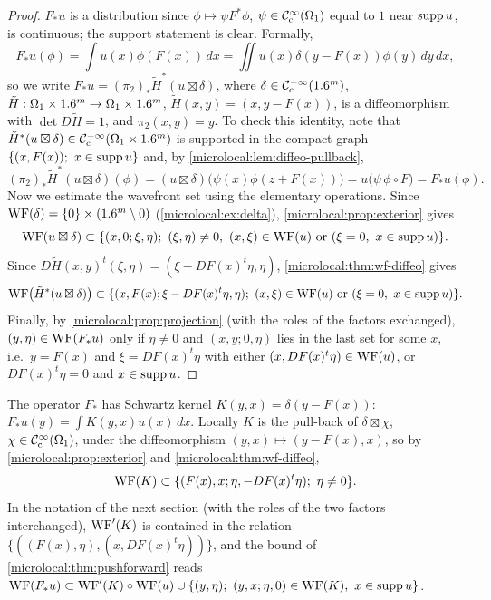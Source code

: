 \begin{proof}
  $F_*u$ is a distribution since $\phi\mapsto\psi F^*\phi$, $\psi\in\mathcal{C}^\infty_{\mathrm{c}}(\Omega_1)$
  equal to $1$ near $\operatorname{supp} u$, is continuous; the support statement is clear.
  Formally,
  \begin{equation*}
    F_*u(\phi)=\int u(x)\phi(F(x))\,dx=\iint u(x)\delta(y-F(x))\phi(y)\,dy\,dx,
  \end{equation*}
  so we write $F_*u=(\pi_2)_*\tilde H^*(u\boxtimes\delta)$, where
  $\delta\in\mathcal{C}^{-\infty}_{\mathrm{c}}(1.6^m)$, $\tilde H:\Omega_1\times1.6^m\to\Omega_1\times1.6^m$,
  $\tilde H(x,y)=(x,y-F(x))$, is a diffeomorphism with $\det D\tilde H=1$, and
  $\pi_2(x,y)=y$. To check this identity, note that
  $\tilde H^*(u\boxtimes\delta)\in\mathcal{C}^{-\infty}_{\mathrm{c}}(\Omega_1\times1.6^m)$ is supported in the
  compact graph $\{(x,F(x));\ x\in\operatorname{supp} u\}$ and, by
  \cref{microlocal:lem:diffeo-pullback},
  \begin{equation*}
    (\pi_2)_*\tilde H^*(u\boxtimes\delta)(\phi)
    =(u\boxtimes\delta)\bigl(\psi(x)\phi(z+F(x))\bigr)=u\bigl(\psi\,\phi\circ F\bigr)
    =F_*u(\phi).
  \end{equation*}
  Now we estimate the wavefront set using the elementary operations. Since
  $\operatorname{WF}(\delta)=\{0\}\times(1.6^m\setminus0)$ (\cref{microlocal:ex:delta}),
  \cref{microlocal:prop:exterior} gives
  \begin{equation*}
    \WF(u\boxtimes\delta)\subset\{(x,0;\xi,\eta);\ (\xi,\eta)\ne0,\
    (x,\xi)\in\WF(u)\text{ or }(\xi=0,\ x\in\supp u)\}.
  \end{equation*}
  Since $D\tilde H(x,y)^t(\xi,\eta)=(\xi-DF(x)^t\eta,\eta)$,
  \cref{microlocal:thm:wf-diffeo} gives
  \begin{equation*}
    \operatorname{WF}\bigl(\tilde H^*(u\boxtimes\delta)\bigr)\subset\{(x,F(x);\xi-DF(x)^t\eta,\eta);\
    (x,\xi)\in\operatorname{WF}(u)\text{ or }(\xi=0,\ x\in\operatorname{supp} u)\}.
  \end{equation*}
  Finally, by \cref{microlocal:prop:projection} (with the roles of the
  factors exchanged), $(y,\eta)\in\operatorname{WF}(F_*u)$ only if $\eta\ne0$ and
  $(x,y;0,\eta)$ lies in the last set for some $x$, i.e.\ $y=F(x)$ and
  $\xi=DF(x)^t\eta$ with either $(x,DF(x)^t\eta)\in\operatorname{WF}(u)$, or
  $DF(x)^t\eta=0$ and $x\in\operatorname{supp} u$.
\end{proof}

The operator $F_*$ has Schwartz kernel $K(y,x)=\delta(y-F(x))$:
$F_*u(y)=\int K(y,x)u(x)\,dx$. Locally $K$ is the pull-back of
$\delta\boxtimes\chi$, $\chi\in\mathcal{C}^\infty_{\mathrm{c}}(\Omega_1)$, under the diffeomorphism
$(y,x)\mapsto(y-F(x),x)$, so by \cref{microlocal:prop:exterior} and
\cref{microlocal:thm:wf-diffeo},
\begin{equation*}
  \WF(K)\subset\{(F(x),x;\eta,-DF(x)^t\eta);\ \eta\ne0\}.
\end{equation*}
In the notation of the next section (with the roles of the two factors
interchanged), $\operatorname{WF}'(K)$ is contained in the relation
$\{((F(x),\eta),(x,DF(x)^t\eta))\}$, and the bound of
\cref{microlocal:thm:pushforward} reads
$\WF(F_*u)\subset\WFp(K)\circ\WF(u)\cup\{(y,\eta);\ (y,x;\eta,0)\in\WF(K),\ x\in\supp u\}$.

